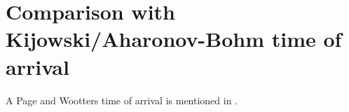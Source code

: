 \section{Comparison with Kijowski/Aharonov-Bohm time of arrival}

A Page and Wootters time of arrival is mentioned in \cite{Gambini_PW}.